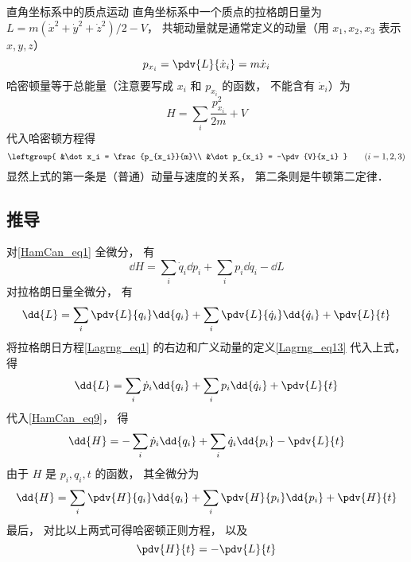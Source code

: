 \begin{exam}{直角坐标系中的质点运动}
直角坐标系中一个质点的拉格朗日量为 $L = m(\dot x^2 + \dot y^2 + \dot z^2)/2 - V$， 共轭动量就是通常定义的动量（用 $x_1,x_2,x_3$ 表示 $x, y, z$）
\begin{equation}
p_{x_i} = \pdv{L}{\dot x_i} = m\dot x_i
\end{equation}
哈密顿量等于总能量（注意要写成 $x_i$ 和 $p_{x_i}$ 的函数， 不能含有 $\dot x_i$）为
\begin{equation}
H = \sum_i \frac{p_{x_i}^2}{2m} + V
\end{equation}
代入哈密顿方程得
\begin{equation}
\leftgroup{
&\dot x_i = \frac{p_{x_i}}{m}\\
&\dot p_{x_i} = -\pdv{V}{x_i}
} \qquad (i = 1,2,3)
\end{equation}
显然上式的第一条是（普通）动量与速度的关系， 第二条则是牛顿第二定律．
\end{exam}

\subsection{推导}
对\autoref{HamCan_eq1} 全微分， 有
\begin{equation}\label{HamCan_eq9}
\dd{H} = \sum_i \dot q_i \dd{p_i} + \sum_i p_i \dd{\dot q_i} - \dd{L}
\end{equation}
对拉格朗日量全微分， 有
\begin{equation}
\dd{L} = \sum_i \pdv{L}{q_i}\dd{q_i} + \sum_i \pdv{L}{\dot q_i}\dd{\dot q_i} + \pdv{L}{t}
\end{equation}
将拉格朗日方程\autoref{Lagrng_eq1} 的右边和广义动量的定义\autoref{Lagrng_eq13} 代入上式， 得
\begin{equation}
\dd{L} = \sum_i \dot p_i\dd{q_i} + \sum_i p_i\dd{\dot q_i} + \pdv{L}{t}
\end{equation}
代入\autoref{HamCan_eq9}， 得
\begin{equation}
\dd{H} = - \sum_i \dot p_i \dd{q_i} + \sum_i \dot q_i \dd{p_i}  - \pdv{L}{t}
\end{equation}
由于 $H$ 是 $p_i, q_i, t$ 的函数， 其全微分为 
\begin{equation}
\dd{H} = \sum_i \pdv{H}{q_i}\dd{q_i} + \sum_i \pdv{H}{p_i}\dd{p_i} + \pdv{H}{t}
\end{equation}
最后， 对比以上两式可得哈密顿正则方程， 以及
\begin{equation}
\pdv{H}{t} = - \pdv{L}{t}
\end{equation}
